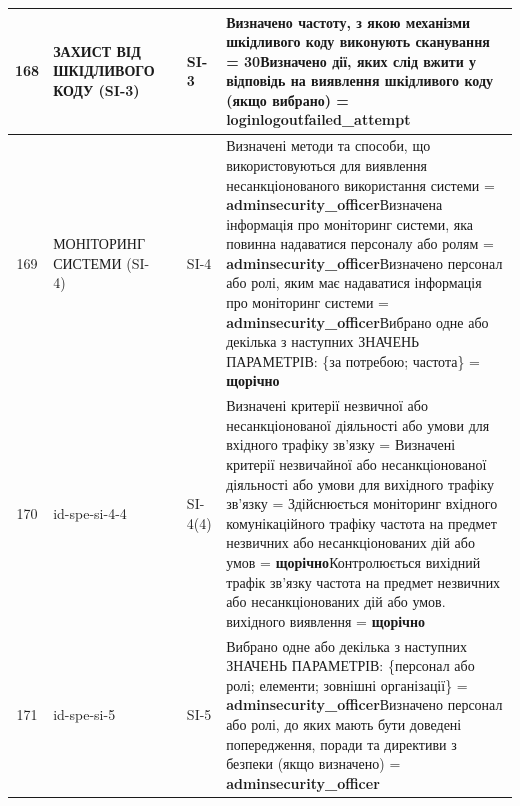 \documentclass[10pt]{article}
\begin{document}
\begin{longtable}{|c|>{\raggedright\arraybackslash}p{2.5cm}|>{\raggedright\arraybackslash}p{4.5cm}|>{\raggedright\arraybackslash}p{3cm}|>{\raggedright\arraybackslash}p{4.5cm}|}
168 & ЗАХИСТ ВІД ШКІДЛИВОГО КОДУ (SI-3) &  & SI-3 & Визначено частоту, з якою механізми шкідливого коду виконують сканування = \textbf{30}\newline Визначено дії, яких слід вжити у відповідь на виявлення шкідливого коду (якщо вибрано) = \textbf{loginlogoutfailed\_\allowbreak{}attempt} \\ \hline
169 & МОНІТОРИНГ СИСТЕМИ (SI-4) &  & SI-4 & Визначені методи та способи, що використовуються для виявлення несанкціонованого використання системи = \textbf{adminsecurity\_\allowbreak{}officer}\newline Визначена інформація про моніторинг системи, яка повинна надаватися персоналу або ролям = \textbf{adminsecurity\_\allowbreak{}officer}\newline Визначено персонал або ролі, яким має надаватися інформація про моніторинг системи = \textbf{adminsecurity\_\allowbreak{}officer}\newline Вибрано одне або декілька з наступних ЗНАЧЕНЬ ПАРАМЕТРІВ: \{за потребою; частота\} = \textbf{щорічно} \\ \hline
170 & id-spe-si-4-4 &  & SI-4(4) & Визначені критерії незвичної або несанкціонованої діяльності або умови для вхідного трафіку зв'язку = \textbf{}\newline Визначені критерії незвичайної або несанкціонованої діяльності або умови для вихідного трафіку зв'язку = \textbf{}\newline Здійснюється моніторинг вхідного комунікаційного трафіку частота на предмет незвичних або несанкціонованих дій або умов = \textbf{щорічно}\newline Контролюється вихідний трафік зв'язку частота на предмет незвичних або несанкціонованих дій або умов. вихідного виявлення = \textbf{щорічно} \\ \hline
171 & id-spe-si-5 &  & SI-5 & Вибрано одне або декілька з наступних ЗНАЧЕНЬ ПАРАМЕТРІВ: \{персонал або ролі; елементи; зовнішні організації\} = \textbf{adminsecurity\_\allowbreak{}officer}\newline Визначено персонал або ролі, до яких мають бути доведені попередження, поради та директиви з безпеки (якщо визначено) = \textbf{adminsecurity\_\allowbreak{}officer} \\ \hline

\end{longtable}
\end{document}
